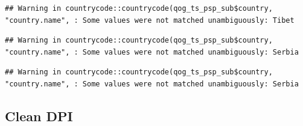 \documentclass[
]{article}
\newenvironment{Shaded}{\begin{snugshade}}{\end{snugshade}}
\newcommand{\KeywordTok}[1]{\textcolor[rgb]{0.13,0.29,0.53}{\textbf{#1}}}
\newcommand{\NormalTok}[1]{#1}
\newcommand{\OperatorTok}[1]{\textcolor[rgb]{0.81,0.36,0.00}{\textbf{#1}}}
\newcommand{\StringTok}[1]{\textcolor[rgb]{0.31,0.60,0.02}{#1}}
\begin{document}
\begin{verbatim}
## Warning in countrycode::countrycode(qog_ts_psp_sub$country, "country.name", : Some values were not matched unambiguously: Tibet
\end{verbatim}

\begin{Shaded}
\end{Shaded}

\begin{verbatim}
## Warning in countrycode::countrycode(qog_ts_psp_sub$country, "country.name", : Some values were not matched unambiguously: Serbia
\end{verbatim}

\begin{Shaded}
\end{Shaded}

\begin{verbatim}
## Warning in countrycode::countrycode(qog_ts_psp_sub$country, "country.name", : Some values were not matched unambiguously: Serbia
\end{verbatim}

\begin{Shaded}
\end{Shaded}

\hypertarget{clean-dpi}{%
\subsection{Clean DPI}\label{clean-dpi}}
\end{document}

